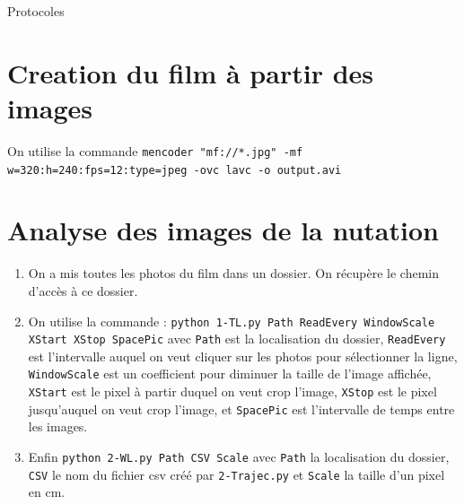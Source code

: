 \documentclass[10pt,a4paper]{article}
\begin{document}
\newpage
\begin{center}
    {\Huge Protocoles}
\end{center}
\appendix
\setcounter{secnumdepth}{1}

\section{Creation du film à partir des images\label{film}}
On utilise la commande \texttt{mencoder "mf://*.jpg" -mf w=320:h=240:fps=12:type=jpeg -ovc lavc -o output.avi}


\section{Analyse des images de la nutation\label{anaNut}}
\begin{enumerate}
    \item On a mis toutes les photos du film dans un dossier. On récupère le chemin d'accès à ce dossier.
    \item On utilise la commande : \texttt{python 1-TL.py Path ReadEvery WindowScale XStart XStop SpacePic} avec \texttt{Path} est la localisation du dossier, \texttt{ReadEvery} est l'intervalle auquel on veut cliquer sur les photos pour sélectionner la ligne, \texttt{WindowScale} est un coefficient pour diminuer la taille de l'image affichée, \texttt{XStart} est le pixel à partir duquel on veut crop l'image, \texttt{XStop} est le pixel jusqu'auquel on veut crop l'image, et \texttt{SpacePic} est l'intervalle de temps entre les images.
    \item Enfin \texttt{python 2-WL.py Path CSV Scale} avec \texttt{Path} la localisation du dossier, \texttt{CSV} le nom du fichier csv créé par \texttt{2-Trajec.py} et \texttt{Scale} la taille d'un pixel en cm.
\end{enumerate}
\end{document}
